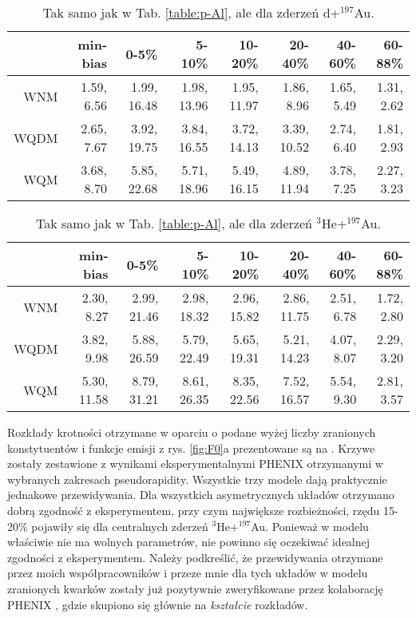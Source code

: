 \documentclass[a4paper,12pt]{article}
\begin{document}
\begin{table}[H]\centering
\begin{tabular}{|r|r|r|r|r|r|r|r|} \hline
 & min-bias & 0-5\% & 5-10\% & 10-20\% & 20-40\% & 40-60\% & 60-88\% \\ \hline
WNM  & 1.59, 6.56 & 1.99, 16.48 & 1.98, 13.96 & 1.95, 11.97 & 1.86, 8.96 & 1.65, 5.49 & 1.31, 2.62 \\ \hline
WQDM & 2.65, 7.67 & 3.92, 19.75 & 3.84, 16.55 & 3.72, 14.13 & 3.39, 10.52 & 2.74, 6.40 & 1.81, 2.93 \\ \hline
WQM  & 3.68, 8.70 & 5.85, 22.68 & 5.71, 18.96 & 5.49, 16.15 & 4.89, 11.94 & 3.78, 7.25 & 2.27, 3.23 \\ \hline
\end{tabular}
\caption{Tak samo jak w Tab. \ref{table:p-Al}, ale dla zderzeń d+$^{197}$Au.}\label{table:d-Au}
\end{table}
\begin{table}[H]\centering
\begin{tabular}{|r|r|r|r|r|r|r|r|} \hline
 & min-bias & 0-5\% & 5-10\% & 10-20\% & 20-40\% & 40-60\% & 60-88\% \\ \hline
WNM  & 2.30, 8.27 & 2.99, 21.46 & 2.98, 18.32 & 2.96, 15.82 & 2.86, 11.75 & 2.51, 6.78 & 1.72, 2.80 \\ \hline
WQDM & 3.82, 9.98 & 5.88, 26.59 & 5.79, 22.49 & 5.65, 19.31 & 5.21, 14.23 & 4.07, 8.07 & 2.29, 3.20 \\ \hline
WQM  & 5.30, 11.58 & 8.79, 31.21 & 8.61, 26.35 & 8.35, 22.56 & 7.52, 16.57 & 5.54, 9.30 & 2.81, 3.57 \\ \hline
\end{tabular}
\caption{Tak samo jak w Tab. \ref{table:p-Al}, ale dla zderzeń $^3$He+$^{197}$Au.}\label{table:he-Au}
\end{table}

Rozkłady krotności otrzymane w oparciu o podane wyżej liczby zranionych konstytuentów i funkcje emisji z rys. \ref{fig:F0}a prezentowane są na . Krzywe zostały zestawione z wynikami eksperymentalnymi PHENIX otrzymanymi w wybranych zakresach pseudorapidity. Wszystkie trzy modele dają praktycznie jednakowe przewidywania. Dla wszystkich asymetrycznych układów otrzymano dobrą zgodność z eksperymentem, przy czym największe rozbieżności, rzędu 15-20\% pojawiły się dla centralnych zderzeń $^3$He+$^{197}$Au. Ponieważ w modelu właściwie nie ma wolnych parametrów, nie powinno się oczekiwać idealnej zgodności z eksperymentem. Należy podkreślić, że przewidywania otrzymane przez moich współpracowników i przeze mnie dla tych układów w modelu zranionych kwarków zostały już pozytywnie zweryfikowane przez kolaborację PHENIX \cite{Adare:2018toe}, gdzie skupiono się głównie na \textit{kształcie} rozkładów.
\end{document}
